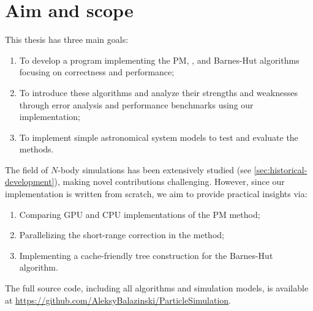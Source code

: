 \section{Aim and scope}
This thesis has three main goals:
\begin{enumerate}
    \item To develop a program implementing the PM, \PThreeM{}, and Barnes-Hut algorithms focusing on correctness and performance;
    \item To introduce these algorithms and analyze their strengths and weaknesses through error analysis and performance benchmarks using our implementation;
    \item To implement simple astronomical system models to test and evaluate the methods.
\end{enumerate}
The field of $N$-body simulations has been extensively studied (see \autoref{sec:historical-development}), making novel contributions challenging.
However, since our implementation is written from scratch, we aim to provide practical insights via:
\begin{enumerate}
    \item Comparing GPU and CPU implementations of the PM method;
    \item Parallelizing the short-range correction in the \PThreeM{} method;
    \item Implementing a cache-friendly tree construction for the Barnes-Hut algorithm.
\end{enumerate}
The full source code, including all algorithms and simulation models, is available at \url{https://github.com/AleksyBalazinski/ParticleSimulation}.